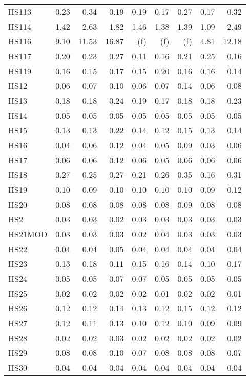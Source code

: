 \documentclass[11pt,twoside]{article}
\begin{document}
{\begin{longtable}[c]{|l|r|r|r|r|r|r|r|r|}
HS113 & 0.23 & 0.34 & 0.19 & 0.19 & 0.17 & 0.27 & 0.17 & 0.32 \\
HS114 & 1.42 & 2.63 & 1.82 & 1.46 & 1.38 & 1.39 & 1.09 & 2.49 \\
HS116 & 9.10 & 11.53 & 16.87 & (f) & (f) & (f) & 4.81 & 12.18 \\
HS117 & 0.20 & 0.23 & 0.27 & 0.11 & 0.16 & 0.21 & 0.25 & 0.16 \\
HS119 & 0.16 & 0.15 & 0.17 & 0.15 & 0.20 & 0.16 & 0.16 & 0.14 \\
HS12 & 0.06 & 0.07 & 0.10 & 0.06 & 0.07 & 0.14 & 0.06 & 0.08 \\
HS13 & 0.18 & 0.18 & 0.24 & 0.19 & 0.17 & 0.18 & 0.18 & 0.23 \\
HS14 & 0.05 & 0.05 & 0.05 & 0.05 & 0.05 & 0.05 & 0.05 & 0.05 \\
HS15 & 0.13 & 0.13 & 0.22 & 0.14 & 0.12 & 0.15 & 0.13 & 0.14 \\
HS16 & 0.04 & 0.06 & 0.12 & 0.04 & 0.05 & 0.09 & 0.03 & 0.06 \\
HS17 & 0.06 & 0.06 & 0.12 & 0.06 & 0.05 & 0.06 & 0.06 & 0.06 \\
HS18 & 0.27 & 0.25 & 0.27 & 0.21 & 0.26 & 0.35 & 0.16 & 0.31 \\
HS19 & 0.10 & 0.09 & 0.10 & 0.10 & 0.10 & 0.10 & 0.09 & 0.12 \\
HS20 & 0.08 & 0.08 & 0.08 & 0.08 & 0.08 & 0.09 & 0.08 & 0.08 \\
HS2 & 0.03 & 0.03 & 0.02 & 0.03 & 0.03 & 0.03 & 0.03 & 0.03 \\
HS21MOD & 0.03 & 0.03 & 0.03 & 0.02 & 0.04 & 0.03 & 0.03 & 0.03 \\
HS22 & 0.04 & 0.04 & 0.05 & 0.04 & 0.04 & 0.04 & 0.04 & 0.04 \\
HS23 & 0.13 & 0.18 & 0.11 & 0.15 & 0.16 & 0.14 & 0.10 & 0.17 \\
HS24 & 0.05 & 0.05 & 0.07 & 0.07 & 0.05 & 0.05 & 0.05 & 0.05 \\
HS25 & 0.02 & 0.02 & 0.02 & 0.02 & 0.01 & 0.02 & 0.02 & 0.01 \\
HS26 & 0.12 & 0.12 & 0.14 & 0.13 & 0.12 & 0.15 & 0.12 & 0.12 \\
HS27 & 0.12 & 0.11 & 0.13 & 0.10 & 0.12 & 0.10 & 0.09 & 0.09 \\
HS28 & 0.02 & 0.02 & 0.03 & 0.02 & 0.02 & 0.02 & 0.02 & 0.02 \\
HS29 & 0.08 & 0.08 & 0.10 & 0.07 & 0.08 & 0.08 & 0.08 & 0.07 \\
HS30 & 0.04 & 0.04 & 0.04 & 0.04 & 0.04 & 0.04 & 0.04 & 0.04 \\

\end{longtable}}
\end{document}
